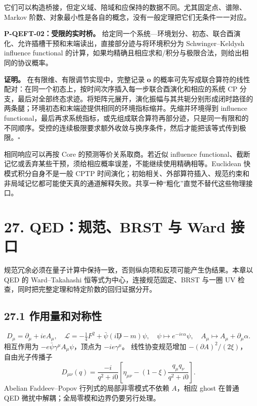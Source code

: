 \documentclass[
  11pt,
  oneside]{book}
\begin{document}
它们可以构造桥接，但定义域、陪域和应保持的数据不同。尤其固定点、谱隙、Markov
阶数、对象最小性是各自的概念，没有一般定理把它们无条件一一对应。

\protect\hypertarget{p-qeft-02}{}{}

\textbf{P-QEFT-02：受限的实时桥。}
给定同一个系统---环境划分、初态、联合酉演化、允许插槽干预和末端读出，直接部分迹与将环境积分为
Schwinger--Keldysh influence functional
的计算，如果均精确且相应求和/积分与极限合法，则给出相同的协议概率。

\textbf{证明。} 在有限维、有限调节实现中，完整记录 \(\mathbf o\)
的概率可先写成联合算符的线性配对：在同一个初态上，按时间次序插入每一步联合酉演化和相应的系统
CP
分支，最后对全部终态求迹。将矩阵元展开，演化振幅与其共轭分别形成闭时路径的两条腿；环境初态和末端迹提供相同的环境指标缩并。先缩并环境得到
influence
functional，最后再求系统指标，或先组成联合算符再部分迹，只是同一有限和的不同顺序。受控的连续极限要求额外收敛与换序条件，然后才能把该等式传到极限。\(\square\)

相同响应可以再按 Core 的预测等价关系取商。若近似 influence
functional、截断记忆或丢弃某些干预，须给相应概率误差，不能继续使用精确相等。Euclidean
快模式积分自身不是一般 CPTP
时间演化；初始相关、外部算符插入、规范约束和非局域记忆都可能使天真的通道解释失败。共享一种``粗化''直觉不替代这些物理接口。

\chapter{27. QED：规范、BRST 与 Ward 接口}\label{ch-27}\hypertarget{ch-27}{}

规范冗余必须在量子计算中保持一致，否则纵向项和反项可能产生伪结果。本章以
QED 的 Ward--Takahashi 恒等式为中心，连接规范固定、BRST 与一圈 UV
检查，同时把完整定理和特定阶数的回归证据分开。

\section{27.1 作用量和对称性}

\[
D_\mu=\partial_\mu+ieA_\mu,\quad
\mathcal L=-\tfrac14F^2+\bar\psi(i\not D-m)\psi,
\quad \psi\mapsto e^{-ie\alpha}\psi,\quad A_\mu\mapsto A_\mu+\partial_\mu\alpha.
\] 相互作用为 \(-e\bar\psi\gamma^\mu A_\mu\psi\)，顶点为
\(-ie\gamma^\mu\)。 线性协变规范增加
\(-(\partial A)^2/(2\xi)\)，自由光子传播子 \[
D_{\mu\nu}(q)=\frac{-i}{q^2+i0}
\left[\eta_{\mu\nu}-(1-\xi)\frac{q_\mu q_\nu}{q^2+i0}\right].
\] Abelian Faddeev--Popov 行列式的局部非零模式不依赖 \(A\)，相应 ghost
在普通 QED 微扰中解耦；全局零模和边界仍要另行处理。
\end{document}

